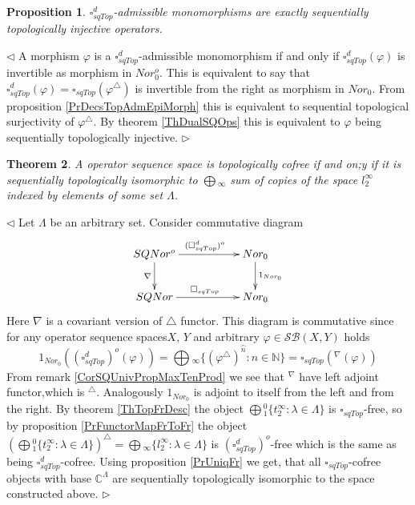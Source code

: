 \documentclass[12pt]{article}
\newtheorem{theorem}{Theorem}[subsection]
\newtheorem{proposition}[theorem]{Proposition}
\newenvironment{proof}{\par $\triangleleft$}{$\triangleright$}
\begin{document}
\begin{proposition}\label{PrDecsTopAdmMonoMorph}
$\square_{sqTop}^d$-admissible monomorphisms are exactly sequentially topologically injective operators.
\end{proposition}
\begin{proof}
A morphism $\varphi$ is a $\square_{sqTop}^d$-admissible monomorphism if and only if $\square_{sqTop}^d(\varphi)$ is invertible as morphism in $Nor_0^o$. This is equivalent to say that $\square_{sqTop}^d(\varphi)=\square_{sqTop}(\varphi^\triangle)$ is invertible from the right as morphism in $Nor_0$. From proposition \ref{PrDecsTopAdmEpiMorph} this is equivalent to sequential topological surjectivity of $\varphi^\triangle$. 
By theorem \ref{ThDualSQOps} this is equivalent to $\varphi$ being sequentially topologically injective.
\end{proof}

\begin{theorem}\label{ThTopCoFrDesc}
A operator sequence space is topologically cofree if and on;y if it is sequentially topologically isomorphic to $\bigoplus{}_\infty$ sum of copies of the space $l_2^\infty$ indexed by elements of some set $\Lambda$.
\end{theorem}
\begin{proof}
Let $\Lambda$ be an arbitrary set. Consider commutative diagram
$$
\xymatrix{
SQNor^o \ar[d]_{\nabla } \ar[rr]^{(\square_{sqTop}^d)^o} & & {Nor_0} \ar[d]^{1_{Nor_0}}\\
SQNor\ar[rr]^{\square_{sqTop}} & & {Nor_0}}
$$
Here $\nabla$ is a covariant version of $\triangle$ functor.
This diagram is commutative since for any operator sequence spaces$X$, $Y$ and arbitrary $\varphi\in\mathcal{SB}(X,Y)$ holds
$$
1_{Nor_0}((\square_{sqTop}^d)^o(\varphi))
=\bigoplus{}_\infty \{(\varphi^\triangle )^{\wideparen{n}} : n \in \mathbb{N}\}
=\square_{sqTop}({}^\nabla(\varphi))
$$
From remark \ref{CorSQUnivPropMaxTenProd} we see that ${}^\nabla$ have left adjoint functor,which is ${}^\triangle$. Analogously $1_{Nor_0}$ is adjoint to itself from the left and from the right. By theorem \ref{ThTopFrDesc} the object $\bigoplus{}_1^0\{t_2^\infty:\lambda\in\Lambda\}$ is $\square_{sqTop}$-free, so by proposition \ref{PrFunctorMapFrToFr} the object 
$(\bigoplus{}_1^0\{t_2^\infty:\lambda\in\Lambda\})^\triangle=\bigoplus{}_\infty\{l_2^\infty:\lambda\in\Lambda\}$ is $(\square_{sqTop}^d)^o$-free which is the same as being $\square_{sqTop}^d$-cofree. Using proposition \ref{PrUniqFr} we get, that all $\square_{sqTop}$-cofree objects with base 
$\mathbb{C}^\Lambda$ are sequentially topologically isomorphic to the space constructed above.
\end{proof}
\end{document}
